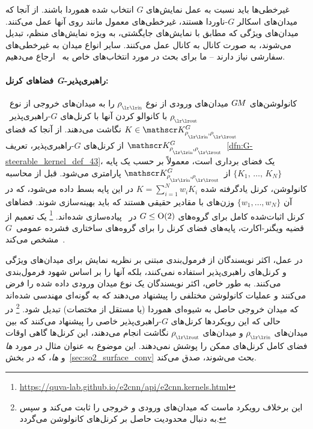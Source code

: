غیرخطی‌ها باید نسبت به عمل نمایش‌های $G$ انتخاب شده هموردا باشند.
از آنجا که میدان‌های اسکالر $G$-ناوردا هستند، غیرخطی‌های معمول مانند  روی آنها عمل می‌کنند.
میدان‌های ویژگی که مطابق با نمایش‌های جایگشتی، به ویژه نمایش‌های منظم، تبدیل می‌شوند، به صورت کانال به کانال عمل می‌کنند.
سایر انواع میدان به غیرخطی‌های سفارشی نیاز دارند -- ما برای بحث در مورد انتخاب‌های خاص به~\cite{Weiler2019_E2CNN} ارجاع می‌دهیم.

\paragraph{فضاهای کرنل \textit{G}-راهبری‌پذیر:}
کانولوشن‌های $G\mkern-1.4muM$ میدان‌های ورودی از نوع $\rhoin$ را به میدان‌های خروجی از نوع~$\rhoout$ با کانوالو کردن آنها با کرنل‌های $G$-راهبری‌پذیر~$K\in\KG$ نگاشت می‌دهند.
از آنجا که فضای $\KG$ از کرنل‌های $G$-راهبری‌پذیر، تعریف~\ref{dfn:G-steerable_kernel_def_43}، یک فضای برداری است، معمولاً بر حسب یک پایه $\{K_1,\,\dots,\,K_N\}$ از~$\KG$ پارامتری می‌شود.
قبل از محاسبه کانولوشن، کرنل یادگرفته شده $K = \sum_{i=1}^N w_i K_i$ در این پایه بسط داده می‌شود، که در آن $\{w_1,\dots,w_N\}$ وزن‌های با مقادیر حقیقی هستند که باید بهینه‌سازی شوند.
فضاهای کرنل اثبات‌شده کامل برای گروه‌های $G\leq\operatorname{O}(2)$ در~\cite{Weiler2019_E2CNN} پیاده‌سازی شده‌اند.%
\footnote{\url{https://quva-lab.github.io/e2cnn/api/e2cnn.kernels.html}}
یک تعمیم از قضیه ویگنر-اکارت، پایه‌های فضای کرنل را برای گروه‌های ساختاری فشرده عمومی~$G$ مشخص می‌کند~\cite{lang2020WignerEckart}.

در عمل، اکثر نویسندگان از فرمول‌بندی مبتنی بر نظریه نمایش برای میدان‌های ویژگی و کرنل‌های راهبری‌پذیر استفاده نمی‌کنند، بلکه آنها را بر اساس شهود فرمول‌بندی می‌کنند.
به طور خاص، اکثر نویسندگان یک نوع میدان ورودی داده شده را فرض می‌کنند و عملیات کانولوشن مختلفی را پیشنهاد می‌دهند که به گونه‌ای مهندسی شده‌اند که میدان خروجی حاصل به شیوه‌ای هموردا (یا مستقل از مختصات) تبدیل شود.%
\footnote{
	این برخلاف رویکرد ماست که میدان‌های ورودی و خروجی را ثابت می‌کند و سپس به دنبال محدودیت حاصل بر کرنل‌های کانولوشن می‌گردد.
}
در حالی که این رویکردها کرنل‌های $G$-راهبری‌پذیر خاصی را پیشنهاد می‌کنند که بین میدان‌های $\rhoin$ و میدان‌های $\rhoout$ نگاشت انجام می‌دهند، این کرنل‌ها گاهی اوقات فضای کامل کرنل‌های ممکن را پوشش نمی‌دهند.
این موضوع به عنوان مثال در مورد \emph{ها} و \emph{ها}، که در بخش~\ref{sec:so2_surface_conv} بحث می‌شوند، صدق می‌کند.
